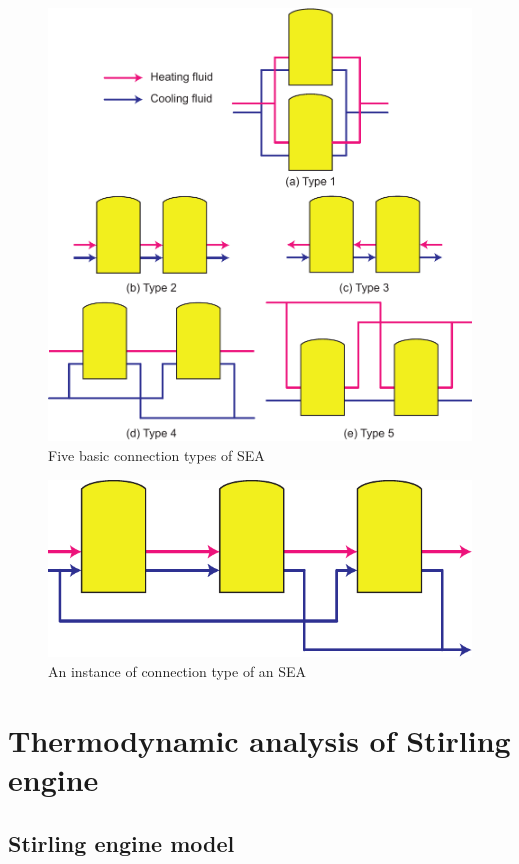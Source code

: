 \documentclass[review,3p,10t]{elsarticle}
\begin{document}
\noindent \begin{figure}[htbp]
\begin{center}
	\includegraphics[width = 0.7\columnwidth]{./graphics/BasicSEA}
	\caption{Five basic connection types of SEA}
	\label{fig:SEA}
\end{center}
\end{figure}

\noindent \begin{figure}[htbp]
\begin{center}
	\includegraphics[width = 0.7\columnwidth]{./graphics/SEA_eg}
	\caption{An instance of connection type of an SEA}
	\label{fig:SEA_eg}
\end{center}
\end{figure}

\section{Thermodynamic analysis of Stirling engine}
\subsection{Stirling engine model\label{sec:StirlingEngineModel}}
\end{document}
